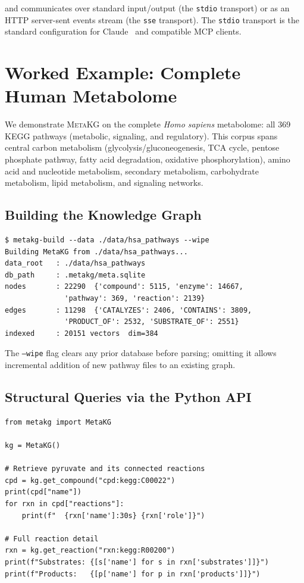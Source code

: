 \documentclass[10pt]{article}
\begin{document}
\noindent and communicates over standard input/output (the \texttt{stdio}
transport) or as an HTTP server-sent events stream (the \texttt{sse}
transport). The \texttt{stdio} transport is the standard configuration for
Claude~\citep{anthropic2024claude} and compatible MCP clients.

\section{Worked Example: Complete Human Metabolome}
\label{sec:usage}

We demonstrate \textsc{MetaKG} on the complete \textit{Homo sapiens}
metabolome: all 369 KEGG pathways (metabolic, signaling, and regulatory).
This corpus spans central carbon metabolism (glycolysis/gluconeogenesis, TCA
cycle, pentose phosphate pathway, fatty acid degradation, oxidative
phosphorylation), amino acid and nucleotide metabolism, secondary metabolism,
carbohydrate metabolism, lipid metabolism, and signaling networks.

\subsection{Building the Knowledge Graph}

\begin{lstlisting}[style=bash, caption={Building the complete human metabolome knowledge graph.}]
$ metakg-build --data ./data/hsa_pathways --wipe
Building MetaKG from ./data/hsa_pathways...
data_root   : ./data/hsa_pathways
db_path     : .metakg/meta.sqlite
nodes       : 22290  {'compound': 5115, 'enzyme': 14667,
              'pathway': 369, 'reaction': 2139}
edges       : 11298  {'CATALYZES': 2406, 'CONTAINS': 3809,
              'PRODUCT_OF': 2532, 'SUBSTRATE_OF': 2551}
indexed     : 20151 vectors  dim=384
\end{lstlisting}

The \texttt{--wipe} flag clears any prior database before parsing; omitting it
allows incremental addition of new pathway files to an existing graph.

\subsection{Structural Queries via the Python API}

\begin{lstlisting}[style=python, caption={Compound retrieval and neighbourhood traversal.}]
from metakg import MetaKG

kg = MetaKG()

# Retrieve pyruvate and its connected reactions
cpd = kg.get_compound("cpd:kegg:C00022")
print(cpd["name"])
for rxn in cpd["reactions"]:
    print(f"  {rxn['name']:30s} {rxn['role']}")

# Full reaction detail
rxn = kg.get_reaction("rxn:kegg:R00200")
print(f"Substrates: {[s['name'] for s in rxn['substrates']]}")
print(f"Products:   {[p['name'] for p in rxn['products']]}")
\end{lstlisting}
\end{document}
